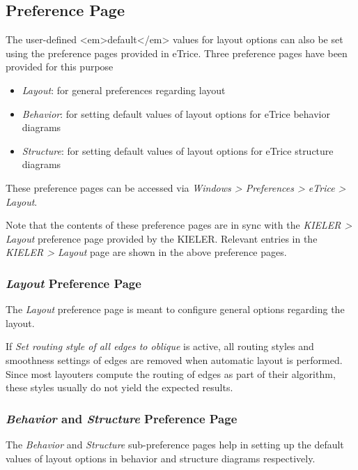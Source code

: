 \subsection{\label{preferencePage}Preference Page}

The user-defined <em>default</em> values for layout options can also be set using the preference pages provided 
in eTrice. Three preference pages have been provided for this purpose
\begin{itemize}
\item \textit{Layout}: for general preferences regarding layout
\item \textit{Behavior}: for setting default values of layout options for eTrice behavior diagrams
\item \textit{Structure}: for setting default values of layout options for eTrice structure diagrams
\end{itemize}

These preference pages can be accessed via \textit{Windows > Preferences > eTrice > Layout}.

Note that the contents of these preference pages are in sync with the \textit{KIELER > Layout} preference 
page provided by the KIELER. Relevant entries in the \textit{KIELER > Layout} page are shown in the above 
preference pages.

\subsubsection{\textit{Layout} Preference Page}

The \textit{Layout} preference page is meant to configure general options regarding the layout. 

If \textit{Set routing style of all edges to oblique} is active, all routing styles and smoothness 
settings of edges are removed when automatic layout is performed. Since most layouters compute the routing 
of edges as part of their algorithm, these styles usually do not yield the expected results.

\subsubsection{\textit{Behavior} and \textit{Structure} Preference Page}

The \textit{Behavior} and \textit{Structure} sub-preference pages help in setting up the default values of 
layout options in behavior and structure diagrams respectively.

